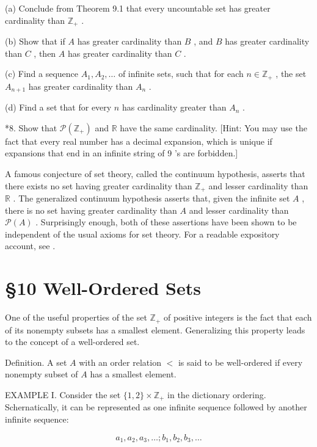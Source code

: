 (a) Conclude from Theorem 9.1 that every uncountable set has greater cardinality than \({\mathbb{Z}}_{ + }\) .

(b) Show that if \(A\) has greater cardinality than \(B\) , and \(B\) has greater cardinality than \(C\) , then \(A\) has greater cardinality than \(C\) .

(c) Find a sequence \({A}_{1},{A}_{2},\ldots\) of infinite sets, such that for each \(n \in  {\mathbb{Z}}_{ + }\) , the set \({A}_{n + 1}\) has greater cardinality than \({A}_{n}\) .

(d) Find a set that for every \(n\) has cardinality greater than \({A}_{n}\) .

*8. Show that \(\mathcal{P}\left( {\mathbb{Z}}_{ + }\right)\) and \(\mathbb{R}\) have the same cardinality. [Hint: You may use the fact that every real number has a decimal expansion, which is unique if expansions that end in an infinite string of 9 ’s are forbidden.]

A famous conjecture of set theory, called the continuum hypothesis, asserts that there exists no set having greater cardinality than \({\mathbb{Z}}_{ + }\) and lesser cardinality than \(\mathbb{R}\) . The generalized continuum hypothesis asserts that, given the infinite set \(A\) , there is no set having greater cardinality than \(A\) and lesser cardinality than \(\mathcal{P}\left( A\right)\) . Surprisingly enough, both of these assertions have been shown to be independent of the usual axioms for set theory. For a readable expository account, see \cite{Smullyan1969}.

\section*{§10 Well-Ordered Sets}

One of the useful properties of the set \({\mathbb{Z}}_{ + }\) of positive integers is the fact that each of its nonempty subsets has a smallest element. Generalizing this property leads to the concept of a well-ordered set.

Definition. A set \(A\) with an order relation \(<\) is said to be well-ordered if every nonempty subset of \(A\) has a smallest element.

EXAMPLE I. Consider the set \(\{ 1,2\}  \times  {\mathbb{Z}}_{ + }\) in the dictionary ordering. Schernatically, it can be represented as one infinite sequence followed by another infinite sequence:

\[
{a}_{1},{a}_{2},{a}_{3},\ldots ;{b}_{1},{b}_{2},{b}_{3},\ldots
\]

